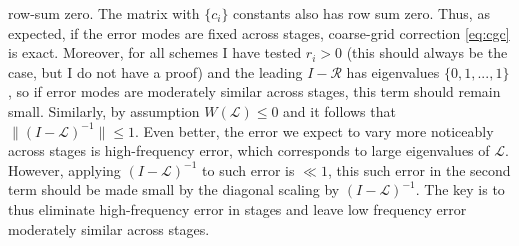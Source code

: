 \documentclass[a4paper,10pt]{article}
\begin{document}
row-sum zero. The matrix with $\{c_i\}$ constants also has row sum zero. Thus,
as expected, if the error modes are fixed across stages, coarse-grid correction
\eqref{eq:cgc} is exact. Moreover, for all schemes I have tested $r_i > 0$ (this
should always be the case, but I do not have a proof) and the leading
$I - \mathcal{R}$ has eigenvalues $\{0,1,...,1\}$, so if error modes are
moderately similar across stages, this term should remain small. Similarly,
by assumption $W(\mathcal{L}) \leq 0$ and it follows that
$\|(I - \mathcal{L})^{-1}\| \leq 1$. Even better, the error we expect
to vary more noticeably across stages is high-frequency error, which
corresponds to large eigenvalues of $\mathcal{L}$. However, applying 
$(I - \mathcal{L})^{-1}$ to such error is $\ll 1$, this such error in
the second term should be made small by the diagonal scaling by
$(I - \mathcal{L})^{-1}$. The key is to thus eliminate high-frequency
error in stages and leave low frequency error moderately similar across
stages.
\end{document}
